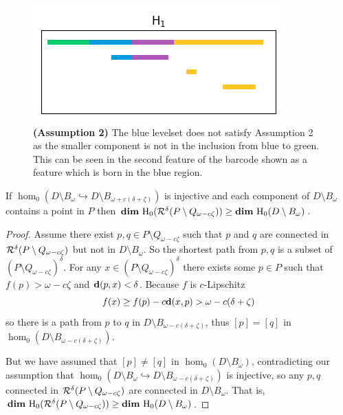 \begin{figure}[htbp]
  \includegraphics[scale=0.7]{scripts/figures/scalar_barcode_H1.png}
  \caption{\textbf{(Assumption 2)} The blue levelset does not satisfy Assumption 2 as the smaller component is not in the inclusion from blue to green.
          This can be seen in the second feature of the barcode shown as a feature which is born in the blue region.}
\end{figure}

\begin{lemma}\label{lem:assumption2}
  If $\hom_0(D\setminus B_\omega\hookrightarrow D\setminus B_{\omega+c(\delta+\zeta)})$ is injective and each component of $D\setminus B_\omega$ contains a point in $P$ then $\mathbf{dim}~\mathrm{H}_0(\mathcal{R}^\delta(P\setminus Q_{\omega-c\zeta})) \geq \mathbf{dim}~\mathrm{H}_0(D\setminus B_\omega)$.
\end{lemma}
\begin{proof}
  Assume there exist $p,q \in P\setminus Q_{\omega-c\zeta}$ such that $p$ and $q$ are connected in $\mathcal{R}^\delta(P\setminus Q_{\omega-c\zeta})$ but not in $D\setminus B_\omega$.
  So the shortest path from $p, q$ is a subset of $(P\setminus Q_{\omega-c\zeta})^\delta$.
  For any $x\in (P\setminus Q_{\omega-c\zeta})^\delta$ there exists some $p\in P$ such that $f(p) > \omega - c\zeta$ and $\mathbf{d}(p,x) < \delta$.
  Because $f$ is $c$-Lipschitz
  \[ f(x)\geq f(p) - c\mathbf{d}(x,p) > \omega - c(\delta+\zeta)\]
  so there is a path from $p$ to $q$ in $D\setminus B_{\omega-c(\delta+\zeta)}$, thus $[p] = [q]$ in $\hom_0(D\setminus B_{\omega-c(\delta+\zeta)})$.

  But we have assumed that $[p]\neq[q]$ in $\hom_0(D\setminus B_\omega)$, contradicting our assumption that $\hom_0(D\setminus B_\omega\hookrightarrow D\setminus B_{\omega-c(\delta+\zeta)})$ is injective, so any $p,q$ connected in $\mathcal{R}^\delta(P\setminus Q_{\omega-c\zeta})$ are connected in $D\setminus B_\omega$.
  That is, $\mathbf{dim}~\mathrm{H}_0(\mathcal{R}^\delta(P\setminus Q_{\omega-c\zeta}))\geq \mathbf{dim}~\mathrm{H}_0(D\setminus B_\omega)$.
\end{proof}

